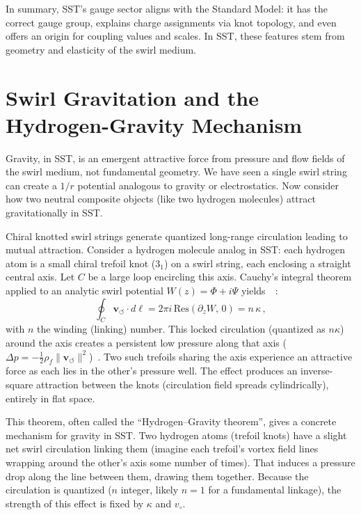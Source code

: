 \documentclass[aps,onecolumn,10pt,nofootinbib]{revtex4}
\newcommand{\swirlarrow}{\circlearrowleft} %
\newcommand{\vswirl}{\mathbf{v}_{\!\swirlarrow}}     %
\begin{document}
	In summary, SST’s gauge sector aligns with the Standard Model: it has the correct gauge group, explains charge assignments via knot topology, and even offers an origin for coupling values and scales. In SST, these features stem from geometry and elasticity of the swirl medium.

	\section{Swirl Gravitation and the Hydrogen-Gravity Mechanism}
	Gravity, in SST, is an emergent attractive force from pressure and flow fields of the swirl medium, not fundamental geometry. We have seen a single swirl string can create a $1/r$ potential analogous to gravity or electrostatics. Now consider how two neutral composite objects (like two hydrogen molecules) attract gravitationally in SST.

	\begin{tcolorbox}[title=Theorem 7.1: Hydrogen-Gravity Mechanism (Swirl Attraction in Flat Space)]
		Chiral knotted swirl strings generate quantized long-range circulation leading to mutual attraction. Consider a hydrogen molecule analog in SST: each hydrogen atom is a small chiral trefoil knot ($3_1$) on a swirl string, each enclosing a straight central axis. Let $C$ be a large loop encircling this axis. Cauchy’s integral theorem applied to an analytic swirl potential $W(z) = \Phi + i\Psi$ yields~\cite{index94}~\cite{index95}:
		\[
			\oint_C \vswirl \cdot d\ell = 2\pi i \,\text{Res}(\partial_z W,\,0) = n\,\kappa\,,
		\]
		with $n$ the winding (linking) number. This locked circulation (quantized as $n\kappa$) around the axis creates a persistent low pressure along that axis ($\Delta p = -\frac{1}{2}\rho_f \|\vswirl\|^2$)~\cite{index96}. Two such trefoils sharing the axis experience an attractive force as each lies in the other’s pressure well. The effect produces an inverse-square attraction between the knots (circulation field spreads cylindrically), entirely in flat space.
	\end{tcolorbox}

	\noindent This theorem, often called the “Hydrogen–Gravity theorem”, gives a concrete mechanism for gravity in SST. Two hydrogen atoms (trefoil knots) have a slight net swirl circulation linking them (imagine each trefoil’s vortex field lines wrapping around the other’s axis some number of times). That induces a pressure drop along the line between them, drawing them together. Because the circulation is quantized ($n$ integer, likely $n=1$ for a fundamental linkage), the strength of this effect is fixed by $\kappa$ and $v_{\circ}$.
\end{document}
